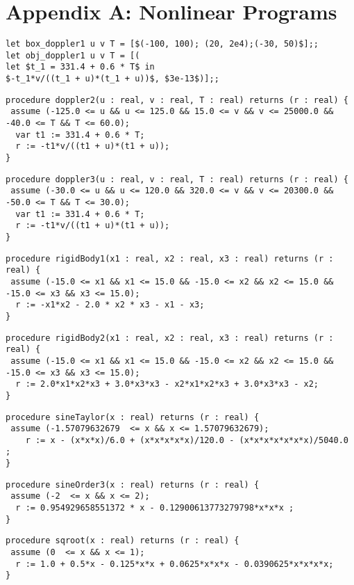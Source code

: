 \documentclass[preprint]{sigplanconf}
\theoremstyle{plain}
\begin{document}
\fi

\appendix
\section*{Appendix A: Nonlinear Programs}
\label{sec:appa}
%
{\scriptsize
\begin{lstlisting}
let box_doppler1 u v T = [$(-100, 100); (20, 2e4);(-30, 50)$];; 
let obj_doppler1 u v T = [(
let $t_1 = 331.4 + 0.6 * T$ in 
$-t_1*v/((t_1 + u)*(t_1 + u))$, $3e-13$)];;
\end{lstlisting}
}
{\scriptsize
\begin{lstlisting}
procedure doppler2(u : real, v : real, T : real) returns (r : real) {
 assume (-125.0 <= u && u <= 125.0 && 15.0 <= v && v <= 25000.0 && -40.0 <= T && T <= 60.0);
  var t1 := 331.4 + 0.6 * T;
  r := -t1*v/((t1 + u)*(t1 + u));
}
\end{lstlisting}
}
{\scriptsize
\begin{lstlisting}
procedure doppler3(u : real, v : real, T : real) returns (r : real) {
 assume (-30.0 <= u && u <= 120.0 && 320.0 <= v && v <= 20300.0 && -50.0 <= T && T <= 30.0);
  var t1 := 331.4 + 0.6 * T;
  r := -t1*v/((t1 + u)*(t1 + u));
}
\end{lstlisting}
}
{\scriptsize
\begin{lstlisting}
procedure rigidBody1(x1 : real, x2 : real, x3 : real) returns (r : real) {
 assume (-15.0 <= x1 && x1 <= 15.0 && -15.0 <= x2 && x2 <= 15.0 && -15.0 <= x3 && x3 <= 15.0);
  r := -x1*x2 - 2.0 * x2 * x3 - x1 - x3;
}
\end{lstlisting}
}
{\scriptsize
\begin{lstlisting}
procedure rigidBody2(x1 : real, x2 : real, x3 : real) returns (r : real) {
 assume (-15.0 <= x1 && x1 <= 15.0 && -15.0 <= x2 && x2 <= 15.0 && -15.0 <= x3 && x3 <= 15.0);
  r := 2.0*x1*x2*x3 + 3.0*x3*x3 - x2*x1*x2*x3 + 3.0*x3*x3 - x2;
}
\end{lstlisting}
}
{\scriptsize
\begin{lstlisting}
procedure sineTaylor(x : real) returns (r : real) {
 assume (-1.57079632679  <= x && x <= 1.57079632679);
    r := x - (x*x*x)/6.0 + (x*x*x*x*x)/120.0 - (x*x*x*x*x*x*x)/5040.0 ;
}
\end{lstlisting}
}
{\scriptsize
\begin{lstlisting}
procedure sineOrder3(x : real) returns (r : real) {
 assume (-2  <= x && x <= 2);
  r := 0.954929658551372 * x - 0.12900613773279798*x*x*x ;
}
\end{lstlisting}
}
{\scriptsize
\begin{lstlisting}
procedure sqroot(x : real) returns (r : real) {
 assume (0  <= x && x <= 1);
  r := 1.0 + 0.5*x - 0.125*x*x + 0.0625*x*x*x - 0.0390625*x*x*x*x;
}
\end{lstlisting}
}
\end{document}

